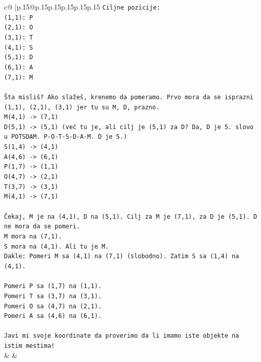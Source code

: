 \documentclass{article}
\begin{document}
{\begin{supertabular}{c@{$\;$}|p{.15\linewidth}@{}p{.15\linewidth}p{.15\linewidth}p{.15\linewidth}p{.15\linewidth}p{.15\linewidth}}
{{{\texttt{Ciljne pozicije:} \\
\texttt{(1,1): P} \\
\texttt{(2,1): O} \\
\texttt{(3,1): T} \\
\texttt{(4,1): S} \\
\texttt{(5,1): D} \\
\texttt{(6,1): A} \\
\texttt{(7,1): M} \\
\\ 
\texttt{Šta misliš? Ako slažeš, krenemo da pomeramo. Prvo mora da se isprazni (1,1), (2,1), (3,1) jer tu su M, D, prazno.} \\
\texttt{M(4,1) {-}> (7,1)} \\
\texttt{D(5,1) {-}> (5,1) (već tu je, ali cilj je (5,1) za D? Da, D je 5. slovo u POTSDAM. P{-}O{-}T{-}S{-}D{-}A{-}M. D je 5.)} \\
\texttt{S(1,4) {-}> (4,1)} \\
\texttt{A(4,6) {-}> (6,1)} \\
\texttt{P(1,7) {-}> (1,1)} \\
\texttt{O(4,7) {-}> (2,1)} \\
\texttt{T(3,7) {-}> (3,1)} \\
\texttt{M(4,1) {-}> (7,1)} \\
\\ 
\texttt{Čekaj, M je na (4,1), D na (5,1). Cilj za M je (7,1), za D je (5,1). D ne mora da se pomeri.} \\
\texttt{M mora na (7,1).} \\
\texttt{S mora na (4,1). Ali tu je M.} \\
\texttt{Dakle: Pomeri M sa (4,1) na (7,1) (slobodno). Zatim S sa (1,4) na (4,1).} \\
\\ 
\texttt{Pomeri P sa (1,7) na (1,1).} \\
\texttt{Pomeri T sa (3,7) na (3,1).} \\
\texttt{Pomeri O sa (4,7) na (2,1).} \\
\texttt{Pomeri A sa (4,6) na (6,1).} \\
\\ 
\texttt{Javi mi svoje koordinate da proverimo da li imamo iste objekte na istim mestima!} \\
            }
        }
    }
    & & \\ \\


\end{supertabular}}
\end{document}
